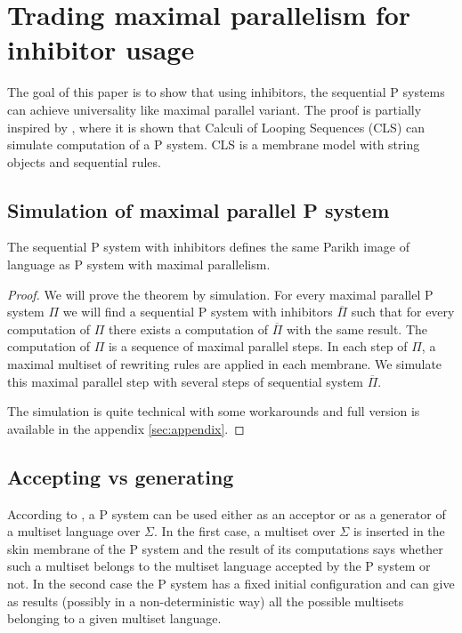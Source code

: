 \documentclass[llncs,submission,copyright,creativecommons]{../lib/lncs/llncs}
\begin{document}
\section{Trading maximal parallelism for inhibitor usage}
\label{sec:inhibitors}
The goal of this paper is to show that using inhibitors, the sequential P systems can achieve universality like maximal parallel variant. The proof is partially inspired by \cite{Barbuti07thecalculus}, where it is shown that Calculi of Looping Sequences (CLS) can simulate computation of a P system. CLS is a membrane model with string objects and sequential rules.



\subsection{Simulation of maximal parallel P system} %
\label{sub:simulation_of_maximal_parallel_p_system}

\begin{theorem}
\label{theorem:inhibitors_generative_universal}
  The sequential P system with inhibitors defines the same Parikh image of language as P system with maximal parallelism.
\end{theorem}

\begin{proof}
  We will prove the theorem by simulation. For every maximal parallel P system $\Pi$ we will find a sequential P system with inhibitors $\overline{\Pi}$ such that for every computation of $\Pi$ there exists a computation of $\overline{\Pi}$ with the same result.
  The computation of $\Pi$ is a sequence of maximal parallel steps.
  In each step of $\Pi$, a maximal multiset of rewriting rules are applied in each membrane.
  We simulate this maximal parallel step with several steps of sequential system $\overline{\Pi}$.

  The simulation is quite technical with some workarounds and full version is available in the appendix \ref{sec:appendix}.
\end{proof}

\subsection{Accepting vs generating} %
\label{sub:accepting_vs_generating}
  According to \cite{Barbuti:2010:MSW:1946067.1946081}, a P system can be used either as an acceptor or as a generator of a multiset language over $\Sigma$. In the first case, a multiset over $\Sigma$ is inserted in the skin membrane of the P system and the result of its computations says whether such a multiset belongs to the multiset language accepted by the P system or not. In the second case the P system has a fixed initial configuration and can give as results (possibly in a non-deterministic way) all the possible multisets belonging to a given multiset language.
\end{document}
